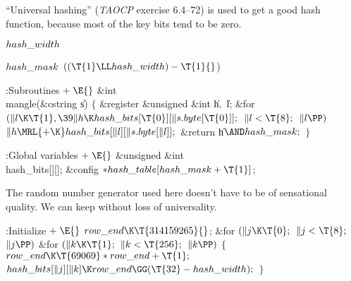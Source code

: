 ``Universal hashing'' ({\sl TAOCP\/} exercise 6.4--72) is used to get a
good hash function, because most of the key bits tend to be zero.

\Y\B\4\D$\\{hash\_width}$ \5
\par
\B\4\D$\\{hash\_mask}$ \5
$((\T{1}\LL\\{hash\_width})-\T{1}{}$)\par
\Y\B\4:Subroutines\X${}\mathrel+\E{}$\6
\&{int} \\{mangle}(\&{cstring} \|s)\1\1\2\2\6
${}\{{}$\1\6
\&{register} \&{unsigned} \&{int} \|h${},{}$ \|l;\7
\&{for} ${}(\|l\K\T{1},\39\|h\K\\{hash\_bits}[\T{0}][\|s.\\{byte}[\T{0}]];{}$
${}\|l<\T{8};{}$ ${}\|l\PP){}$\1\5
${}\|h\MRL{+{\K}}\\{hash\_bits}[\|l][\|s.\\{byte}[\|l]];{}$\2\6
\&{return} \|h${}\AND\\{hash\_mask};{}$\6
\4${}\}{}$\2\par
\fi

\B{}:Global variables\X${}\mathrel+\E{}$\6
\&{unsigned} \&{int} \\{hash\_bits}[][];\6
\&{config} ${}{*}\\{hash\_table}[\\{hash\_mask}+\T{1}]{}$;\par
\fi

The random number generator used here doesn't have to be of sensational
quality. We can keep  without loss of
universality.

\Y\B\4:Initialize\X${}\mathrel+\E{}$\6
$\\{row\_end}\K\T{314159265}{}$;\6
\&{for} ${}(\|j\K\T{0};{}$ ${}\|j<\T{8};{}$ ${}\|j\PP){}$\1\6
\&{for} ${}(\|k\K\T{1};{}$ ${}\|k<\T{256};{}$ ${}\|k\PP){}$\5
${}\{{}$\1\6
${}\\{row\_end}\K\T{69069}*\\{row\_end}+\T{1};{}$\6
${}\\{hash\_bits}[\|j][\|k]\K\\{row\_end}\GG(\T{32}-\\{hash\_width});{}$\6
\4${}\}{}$\2\2\par
\fi

